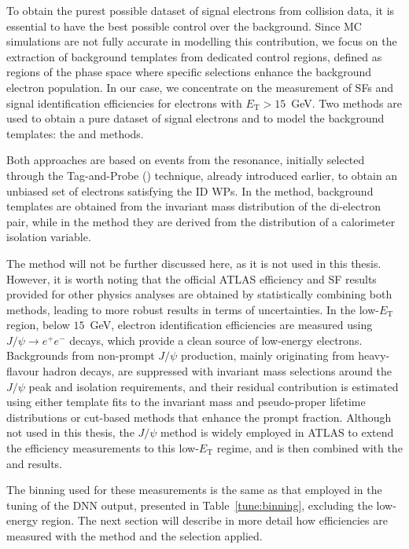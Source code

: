 To obtain the purest possible dataset of signal electrons from collision data, it is essential to have the best possible control over the background. Since MC simulations are not fully accurate in modelling this contribution, we focus on the extraction of background templates from dedicated control regions, defined as regions of the phase space where specific selections enhance the background electron population. In our case, we concentrate on the measurement of SFs and signal identification efficiencies for electrons with $E_{\mathrm{T}} > 15$~GeV. Two methods are used to obtain a pure dataset of signal electrons and to model the background templates: the \zmass and \ziso methods.

Both approaches are based on events from the \zee resonance, initially selected through the Tag-and-Probe (\tp) technique, already introduced earlier, to obtain an unbiased set of electrons satisfying the ID WPs. In the \zmass method, background templates are obtained from the invariant mass distribution of the di-electron pair, while in the \ziso method they are derived from the distribution of a calorimeter isolation variable.

The \ziso method will not be further discussed here, as it is not used in this thesis. However, it is worth noting that the official ATLAS efficiency and SF results provided for other physics analyses are obtained by statistically combining both methods, leading to more robust results in terms of uncertainties. In the low-$E_{\mathrm{T}}$ region, below $15$~GeV, electron identification efficiencies are measured using $J/\psi \to e^+e^-$ decays, which provide a clean source of low-energy electrons. Backgrounds from non-prompt $J/\psi$ production, mainly originating from heavy-flavour hadron decays, are suppressed with invariant mass selections around the $J/\psi$ peak and isolation requirements, and their residual contribution is estimated using either template fits to the invariant mass and pseudo-proper lifetime distributions or cut-based methods that enhance the prompt fraction. Although not used in this thesis, the $J/\psi$ method is widely employed in ATLAS to extend the efficiency measurements to this low-$E_{\mathrm{T}}$ regime, and is then combined with the \zmass and \ziso results.

The binning used for these measurements is the same as that employed in the tuning of the DNN output, presented in Table~\ref{tune:binning}, excluding the low-energy region. The next section will describe in more detail how efficiencies are measured with the \zmass method and the selection applied.

